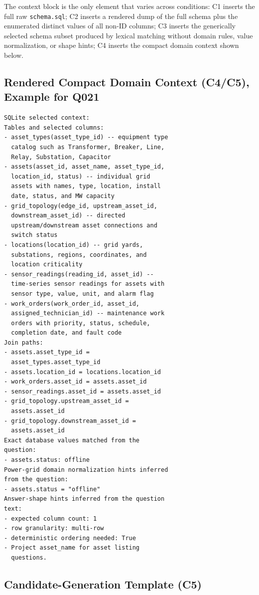 \documentclass[11pt]{article}
\begin{document}
The context block is the only element that varies across conditions: C1 inserts the full raw \texttt{schema.sql}; C2 inserts a rendered dump of the full schema plus the enumerated distinct values of all non-ID columns; C3 inserts the generically selected schema subset produced by lexical matching without domain rules, value normalization, or shape hints; C4 inserts the compact domain context shown below.

\subsection{Rendered Compact Domain Context (C4/C5), Example for Q021}

\begin{small}
\begin{verbatim}
SQLite selected context:
Tables and selected columns:
- asset_types(asset_type_id) -- equipment type
  catalog such as Transformer, Breaker, Line,
  Relay, Substation, Capacitor
- assets(asset_id, asset_name, asset_type_id,
  location_id, status) -- individual grid
  assets with names, type, location, install
  date, status, and MW capacity
- grid_topology(edge_id, upstream_asset_id,
  downstream_asset_id) -- directed
  upstream/downstream asset connections and
  switch status
- locations(location_id) -- grid yards,
  substations, regions, coordinates, and
  location criticality
- sensor_readings(reading_id, asset_id) --
  time-series sensor readings for assets with
  sensor type, value, unit, and alarm flag
- work_orders(work_order_id, asset_id,
  assigned_technician_id) -- maintenance work
  orders with priority, status, schedule,
  completion date, and fault code
Join paths:
- assets.asset_type_id =
  asset_types.asset_type_id
- assets.location_id = locations.location_id
- work_orders.asset_id = assets.asset_id
- sensor_readings.asset_id = assets.asset_id
- grid_topology.upstream_asset_id =
  assets.asset_id
- grid_topology.downstream_asset_id =
  assets.asset_id
Exact database values matched from the
question:
- assets.status: offline
Power-grid domain normalization hints inferred
from the question:
- assets.status = "offline"
Answer-shape hints inferred from the question
text:
- expected column count: 1
- row granularity: multi-row
- deterministic ordering needed: True
- Project asset_name for asset listing
  questions.
\end{verbatim}
\end{small}

\subsection{Candidate-Generation Template (C5)}
\end{document}
